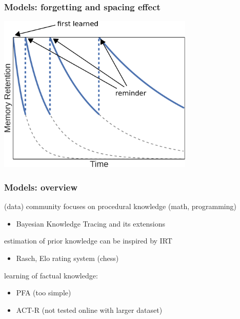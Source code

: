 \documentclass[xcolor=svgnames]{beamer}
\begin{document}
\begin{frame}
	\frametitle{Models: forgetting and spacing effect}
	\begin{center}
		\includegraphics[width=0.7\textwidth]{figure/forgetting_curves.pdf}
	\end{center}
\end{frame}
\begin{frame}
	\frametitle{Models: overview}
	(data) community focuses on procedural knowledge (math, programming)
	\begin{itemize}
		\item Bayesian Knowledge Tracing and its extensions
	\end{itemize}

	\bigskip
	estimation of prior knowledge can be inspired by IRT
	\begin{itemize}
		\item Rasch, Elo rating system (chess)
	\end{itemize}

	\bigskip
	learning of factual knowledge:
	\begin{itemize}
		\item PFA (too simple)
		\item ACT-R (not tested online with larger dataset)
	\end{itemize}
\end{frame}
\end{document}
